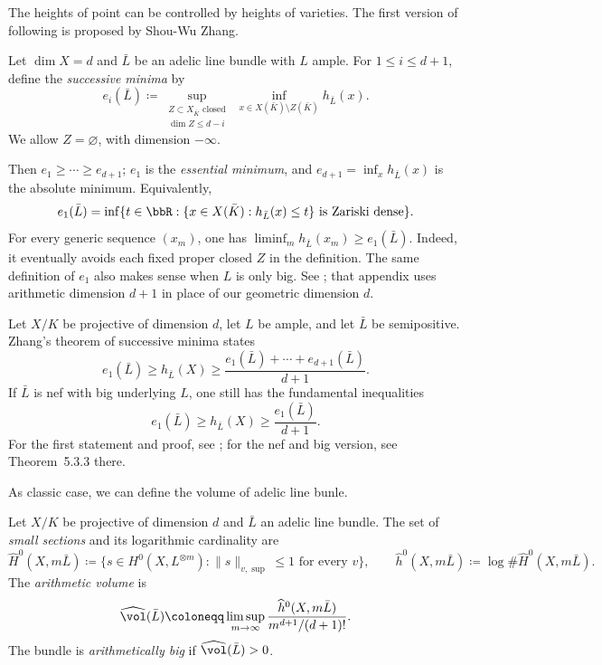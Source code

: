 The heights of point can be controlled by heights of varieties.
The first version of following is proposed by Shou-Wu Zhang.

\begin{definition}[label=\labelNFM{def:successive-minima}, status=draft, tag=0000000]
	\Yang{}
	Let $\dim X = d$ and $\bar L$ be an adelic line bundle with $L$ ample.
	For $1 \leq i \leq d+1$, define the \emph{successive minima} by
	\[ e_i(\bar L) \coloneqq \sup_{\substack{Z \subset X_{\bar K}\text{ closed}\\\dim Z \leq d-i}}\ \inf_{x \in X(\bar K)\setminus Z(\bar K)} h_{\bar L}(x). \]
	We allow $Z = \varnothing$, with dimension $-\infty$.
\end{definition}

\Yang{}
Then $e_1 \geq \cdots \geq e_{d+1}$; $e_1$ is the \emph{essential minimum}, and $e_{d+1} = \inf_x h_{\bar L}(x)$ is the absolute minimum.
Equivalently,
\[ e_1(\bar L) = \inf\{t \in \bbR:\{x \in X(\bar K):h_{\bar L}(x) \leq t\}\text{ is Zariski dense}\}. \]
For every generic sequence $(x_m)$, one has $\liminf_m h_{\bar L}(x_m) \geq e_1(\bar L)$.
Indeed, it eventually avoids each fixed proper closed $Z$ in the definition.
The same definition of $e_1$ also makes sense when $L$ is only big.
See \cite[Appendix~A.5.5]{Yuan-Zhang-2026-AdelicLineBundles}; that appendix uses arithmetic dimension $d+1$ in place of our geometric dimension $d$.

\begin{theorem}[label=\labelNFM{thm:fundamental-inequality-IV}, status=draft, tag=0000000, title={{{Fundamental inequality \Yang{}}}}]
	\Yang{}
	Let $X/K$ be projective of dimension $d$, let $L$ be ample, and let $\bar L$ be semipositive.
	Zhang's theorem of successive minima states
	\[ e_1(\bar L) \geq h_{\bar L}(X) \geq \frac{e_1(\bar L)+\cdots+e_{d+1}(\bar L)}{d+1}. \]
	If $\bar L$ is nef with big underlying $L$, one still has the fundamental inequalities
	\[ e_1(\bar L) \geq h_{\bar L}(X) \geq \frac{e_1(\bar L)}{d+1}. \]
	For the first statement and proof, see \cite[Theorem~A.5.2]{Yuan-Zhang-2026-AdelicLineBundles}; for the nef and big version, see Theorem~5.3.3 there.
\end{theorem}


As classic case, we can define the volume of adelic line bunle.

\begin{definition}[label=\labelNFM{def:arithmetic-volume-of-adelic-line-bundle}, status=draft, tag=0000000]
	Let $X/K$ be projective of dimension $d$ and $\bar L$ an adelic line bundle.
	The set of \emph{small sections} and its logarithmic cardinality are
	\[ \widehat H^0(X,m\bar L) \coloneqq \{s \in H^0(X,L^{\otimes m}):\|s\|_{v,\sup} \leq 1\text{ for every }v\}, \qquad \widehat h^0(X,m\bar L) \coloneqq \log\#\widehat H^0(X,m\bar L). \]
	The \emph{arithmetic volume} is
	\[ \widehat{\vol}(\bar L) \coloneqq \limsup_{m \to \infty}\frac{\widehat h^0(X,m\bar L)}{m^{d+1}/(d+1)!}. \]
	The bundle is \emph{arithmetically big} if $\widehat{\vol}(\bar L) > 0$.
	\Yang{}
\end{definition}

